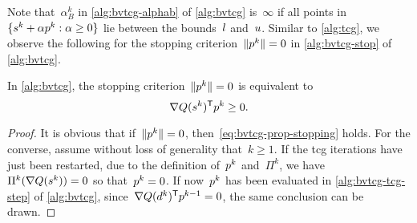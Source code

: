 Note that~$\alpha_B^k$ in \cref{alg:bvtcg-alphab} of \cref{alg:bvtcg} is~$\infty$ if all points in~$\set{\sstep[k] + \alpha \pstep[k] : \alpha \ge 0}$ lie between the bounds~$l$ and~$u$.
Similar to \cref{alg:tcg}, we observe the following for the stopping criterion~$\norm{\pstep[k]} = 0$ in \cref{alg:bvtcg-stop} of \cref{alg:bvtcg}.

\begin{proposition}
    In \cref{alg:bvtcg}, the stopping criterion~$\norm{\pstep[k]} = 0$ is equivalent to
    \begin{equation}
        \label{eq:bvtcg-prop-stopping}
        \nabla Q (\sstep[k])^{\T} \pstep[k] \ge 0.
    \end{equation}
\end{proposition}

\begin{proof}
    It is obvious that if~$\norm{\pstep[k]} = 0$, then~\cref{eq:bvtcg-prop-stopping} holds.
    For the converse, assume without loss of generality that~$k \ge 1$.
    If the \gls{tcg} iterations have just been restarted, due to the definition of~$\pstep[k]$ and~$\Pi^k$, we have~$\Pi^k(\nabla Q(\sstep[k])) = 0$ so that~$\pstep[k] = 0$.
    If now~$\pstep[k]$ has been evaluated in \cref{alg:bvtcg-tcg-step} of \cref{alg:bvtcg}, since~$\nabla Q(\step[k])^{\T} \pstep[k - 1] = 0$, the same conclusion can be drawn.
\end{proof}

